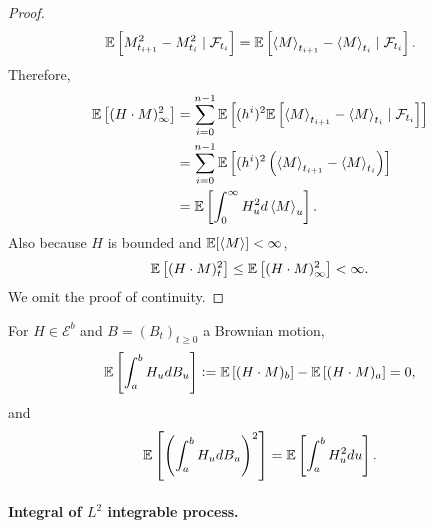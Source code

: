 \begin{proof}
    \begin{equation*}
        \mathbb{E}\left[M_{t_{i+1}}^2 - M_{t_i}^2 \mid \mathcal{F}_{t_i}\right] = \mathbb{E}\left[\left\langle M \right\rangle_{t_{i+1}} - \left\langle M \right\rangle_{t_i} \mid \mathcal{F}_{t_i}\right].
    \end{equation*}
    Therefore,
    \begin{align*}
        \mathbb{E}\left[(H \cdot M)^2_\infty\right] &= \sum_{i=0}^{n-1} \mathbb{E}\left[(h^i)^2 \mathbb{E}\left[\left\langle M \right\rangle_{t_{i+1}} - \left\langle M \right\rangle_{t_i}\mid \mathcal{F}_{t_i}\right]\right] \\
        &= \sum_{i=0}^{n-1} \mathbb{E}\left[(h^i)^2 \left(\left\langle M \right\rangle_{t_{i+1}} - \left\langle M \right\rangle_{t_i}\right)\right] \\
        &= \mathbb{E}\left[\int_0^\infty H^2_u d\left\langle M \right\rangle_u\right].
    \end{align*}
    Also because $H$ is bounded and $\mathbb{E}[\left\langle M \right\rangle] < \infty$,
    \begin{equation*}
        \mathbb{E}\left[(H \cdot M)^2_t\right] \leq \mathbb{E}\left[(H \cdot M)^2_\infty\right] < \infty. \qedhere
    \end{equation*}
    We omit the proof of continuity.
\end{proof}

\begin{cor}
    For $H \in \mathcal{E}^b$ and $B=(B_t)_{t \geq 0}$ a Brownian motion, 
    \begin{equation*}
        \mathbb{E}\left[\int_a^b H_u dB_u\right] \vcentcolon= \mathbb{E}\left[(H \cdot M)_b\right] - \mathbb{E}\left[(H \cdot M)_a\right] = 0,
    \end{equation*}
    and
    \begin{equation*}
        \mathbb{E}\left[\left(\int_a^b H_u dB_u\right)^2\right] = \mathbb{E}\left[\int_a^b H_u^2 du\right].
    \end{equation*}
\end{cor}

\paragraph{Integral of $L^2$ integrable process.}

